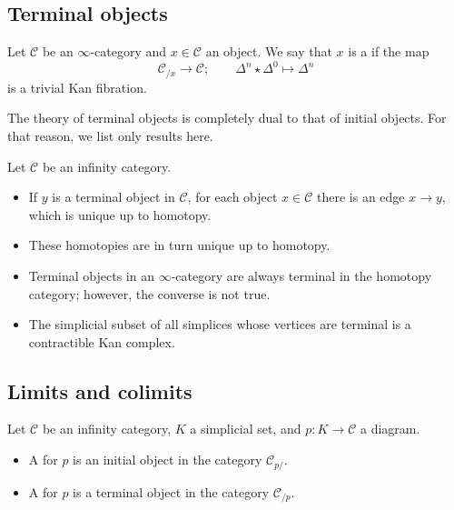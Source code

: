 \documentclass[main.tex]{subfiles}
\begin{document}
\subsection{Terminal objects}
\label{ssc:terminal_objects}

\begin{definition}
  \label{def:terminal_object}
  Let $\mathcal{C}$ be an $\infty$-category and $x \in \mathcal{C}$ an object. We say that $x$ is a  if the map
  \begin{equation*}
    \mathcal{C}_{/x} \to \mathcal{C};\qquad \Delta^{n} \star \Delta^{0} \mapsto \Delta^{n}
  \end{equation*}
  is a trivial Kan fibration.
\end{definition}


The theory of terminal objects is completely dual to that of initial objects. For that reason, we list only results here.

Let $\mathcal{C}$ be an infinity category.
\begin{itemize}
  \item If $y$ is a terminal object in $\mathcal{C}$, for each object $x \in \mathcal{C}$ there is an edge $x \to y$, which is unique up to homotopy.

  \item These homotopies are in turn unique up to homotopy.

  \item Terminal objects in an $\infty$-category are always terminal in the homotopy category; however, the converse is not true.

  \item The simplicial subset of all simplices whose vertices are terminal is a contractible Kan complex.
\end{itemize}

\subsection{Limits and colimits}
\label{ssc:limits_and_colimits_in_infty_cats}

\begin{definition}
  \label{def:limit_cone}
  Let $\mathcal{C}$ be an infinity category, $K$ a simplicial set, and $p\colon K \to \mathcal{C}$ a diagram.
  \begin{itemize}
    \item A  for $p$ is an initial object in the category $\mathcal{C}_{p/}$.

    \item A  for $p$ is a terminal object in the category $\mathcal{C}_{/p}$.
  \end{itemize}
\end{definition}
\end{document}
